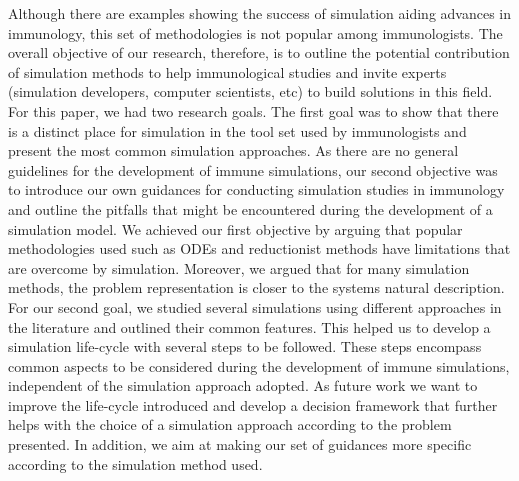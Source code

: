 \documentclass{llncs}
\begin{document}
Although there are examples showing the success of simulation aiding advances in immunology, this set of methodologies is not popular among immunologists. The overall objective of our research, therefore, is to outline the potential contribution of simulation methods to help immunological studies and invite experts (simulation developers, computer scientists, etc) to build solutions in this field. For this paper, we had two research goals. The first goal was to show that there is a distinct place for simulation in the tool set used by immunologists and present the most common simulation approaches. As there are no general guidelines for the development of immune simulations, our second objective was to introduce our own guidances for conducting simulation studies in immunology and outline the pitfalls that might be encountered during the development of a simulation model. We achieved our first objective by arguing that popular methodologies used such as ODEs and reductionist methods have limitations that are overcome by simulation. Moreover, we argued that for many simulation methods, the problem representation is closer to the systems natural description. For our second goal, we studied several simulations using different approaches in the literature and outlined their common features. This helped us to develop a simulation life-cycle with several steps to be followed. These steps encompass common aspects to be considered during the development of immune simulations, independent of the simulation approach adopted. As future work we want to improve the life-cycle introduced and develop a decision framework that further helps with the choice of a simulation approach according to the problem presented. In addition, we aim at making our set of guidances more specific according to the simulation method used.



\end{document}
